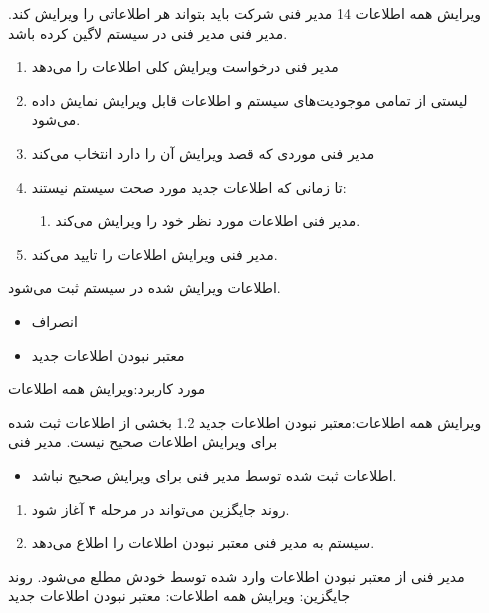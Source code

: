 {
	\usecase
	{ویرایش همه اطلاعات}
	{14}
	{مدیر فنی شرکت باید بتواند هر اطلاعاتی را ویرایش کند.}
	{مدیر فنی}
	{}
	{مدیر فنی در سیستم لاگین کرده باشد.}
	{
		\vspace*{-0.6cm}
		\begin{enumerate}
			\item مدیر فنی درخواست ویرایش کلی اطلاعات را می‌دهد
			\item لیستی از تمامی موجودیت‌های سیستم و اطلاعات قابل ویرایش نمایش داده می‌شود.
			
			\item مدیر فنی موردی که قصد ویرایش آن را دارد انتخاب می‌کند
			
			\item تا زمانی که اطلاعات جدید مورد صحت سیستم نیستند:
			\begin{enumerate}[label=\theenumi.\arabic*.]
				\item مدیر فنی اطلاعات مورد نظر خود را ویرایش می‌کند.
			\end{enumerate}
			\item 
			مدیر فنی ویرایش اطلاعات را تایید می‌کند.
			
		\end{enumerate}
	}
	{اطلاعات ویرایش شده در سیستم ثبت می‌شود.}
	{
		\begin{itemize}
			\item
			انصراف
			\item 
			معتبر نبودن اطلاعات جدید
		\end{itemize}
	}
	{
		مورد کاربرد:ویرایش همه اطلاعات
	}
}

	
	
	\alternativeflow
	{
		ویرایش همه اطلاعات:معتبر نبودن اطلاعات جدید
	}
	{1.2}
	{
		بخشی از اطلاعات ثبت شده برای ویرایش اطلاعات صحیح نیست.
	}
	{
		مدیر فنی
	}
	{}
	{
		\begin{itemize}
			\vspace*{-0.6cm}
			\item 
			اطلاعات ثبت شده توسط مدیر فنی برای ویرایش صحیح نباشد.
		
		\end{itemize}
	}
	{
		\vspace*{-0.6cm}
		\begin{enumerate}
			\item 
			روند جایگزین می‌تواند در مرحله ۴ آغاز شود.
			\item
			سیستم به مدیر فنی معتبر نبودن اطلاعات را اطلاع می‌دهد.
		\end{enumerate}
	}
	{
		مدیر فنی از معتبر نبودن اطلاعات وارد شده توسط خودش مطلع می‌شود.
	}
	{
		روند جایگزین: ویرایش همه اطلاعات: معتبر نبودن اطلاعات جدید
	}